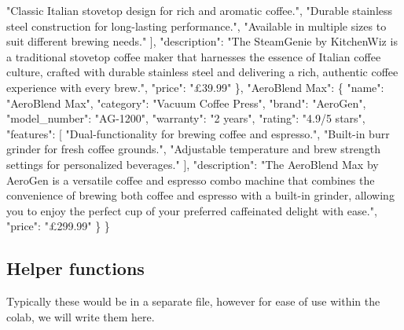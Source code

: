 \documentclass[
  letterpaper,
  DIV=11,
  numbers=noendperiod]{scrreprt}
\newenvironment{Shaded}{\begin{snugshade}}{\end{snugshade}}
\newcommand{\NormalTok}[1]{\textcolor[rgb]{0.00,0.23,0.31}{#1}}
\newcommand{\StringTok}[1]{\textcolor[rgb]{0.13,0.47,0.30}{#1}}
\begin{document}
\begin{Shaded}
\begin{Highlighting}[]
        \StringTok{"Classic Italian stovetop design for rich and aromatic coffee."}\NormalTok{,}
        \StringTok{"Durable stainless steel construction for long{-}lasting performance."}\NormalTok{,}
        \StringTok{"Available in multiple sizes to suit different brewing needs."}
\NormalTok{      ],}
      \StringTok{"description"}\NormalTok{: }\StringTok{"The SteamGenie by KitchenWiz is a traditional stovetop coffee maker that harnesses the essence of Italian coffee culture, crafted with durable stainless steel and delivering a rich, authentic coffee experience with every brew."}\NormalTok{,}
      \StringTok{"price"}\NormalTok{: }\StringTok{"£39.99"}
\NormalTok{    \},}
    \StringTok{"AeroBlend Max"}\NormalTok{: \{}
      \StringTok{"name"}\NormalTok{: }\StringTok{"AeroBlend Max"}\NormalTok{,}
      \StringTok{"category"}\NormalTok{: }\StringTok{"Vacuum Coffee Press"}\NormalTok{,}
      \StringTok{"brand"}\NormalTok{: }\StringTok{"AeroGen"}\NormalTok{,}
      \StringTok{"model\_number"}\NormalTok{: }\StringTok{"AG{-}1200"}\NormalTok{,}
      \StringTok{"warranty"}\NormalTok{: }\StringTok{"2 years"}\NormalTok{,}
      \StringTok{"rating"}\NormalTok{: }\StringTok{"4.9/5 stars"}\NormalTok{,}
      \StringTok{"features"}\NormalTok{: [}
        \StringTok{"Dual{-}functionality for brewing coffee and espresso."}\NormalTok{,}
        \StringTok{"Built{-}in burr grinder for fresh coffee grounds."}\NormalTok{,}
        \StringTok{"Adjustable temperature and brew strength settings for personalized beverages."}
\NormalTok{      ],}
      \StringTok{"description"}\NormalTok{: }\StringTok{"The AeroBlend Max by AeroGen is a versatile coffee and espresso combo machine that combines the convenience of brewing both coffee and espresso with a built{-}in grinder, allowing you to enjoy the perfect cup of your preferred caffeinated delight with ease."}\NormalTok{,}
      \StringTok{"price"}\NormalTok{: }\StringTok{"£299.99"}
\NormalTok{    \}}
\NormalTok{\}}
\end{Highlighting}
\end{Shaded}

\hypertarget{helper-functions-1}{%
\subsection{Helper functions}\label{helper-functions-1}}

Typically these would be in a separate file, however for ease of use
within the colab, we will write them here.
\end{document}
